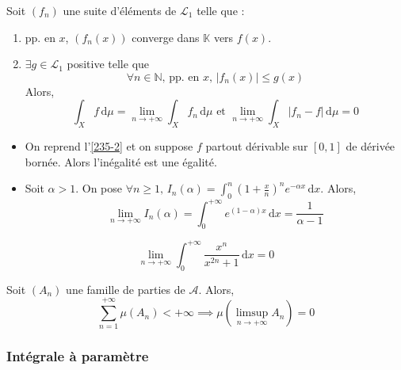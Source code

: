   \begin{theorem}
    Soit $(f_n)$ une suite d'éléments de $\mathcal{L}_1$ telle que :
    \begin{enumerate}[label={\bfseries(\roman*)}]
      \item pp. en $x$, $(f_n(x))$ converge dans $\mathbb{K}$ vers $f(x)$.
      \item $\exists g \in \mathcal{L}_1$ positive telle que
      \[ \forall n \in \mathbb{N}, \, \text{pp. en } x, \, \vert f_n(x) \vert \leq g(x) \]
      Alors,
      \[ \int_X f \, \mathrm{d}\mu = \lim_{n \rightarrow +\infty} \int_X f_n \, \mathrm{d}\mu \text{ et } \lim_{n \rightarrow +\infty} \int_X \vert f_n - f \vert \, \mathrm{d}\mu = 0 \]
    \end{enumerate}
  \end{theorem}

  \begin{example}
    \begin{itemize}
      \item On reprend l'\cref{235-2} et on suppose $f$ partout dérivable sur $[0,1]$ de dérivée bornée. Alors l'inégalité est une égalité.
      \item Soit $\alpha > 1$. On pose $\forall n \geq 1, \, I_n(\alpha) = \int_0^n \left( 1 + \frac{x}{n} \right)^n e^{-\alpha x} \, \mathrm{d}x$. Alors,
      \[ \lim_{n \rightarrow +\infty} I_n(\alpha) = \int_0^{+\infty} e^{(1-\alpha)x} \, \mathrm{d}x = \frac{1}{\alpha - 1} \]
    \end{itemize}
  \end{example}


  \begin{example}
    \[ \lim_{n \rightarrow +\infty} \int_{0}^{+\infty} \frac{x^n}{x^{2n} + 1} \, \mathrm{d}x = 0 \]
  \end{example}


  \begin{application}
    Soit $(A_n)$ une famille de parties de $\mathcal{A}$. Alors,
    \[ \sum_{n=1}^{+\infty} \mu(A_n) < +\infty \implies \mu \left( \limsup_{n \rightarrow +\infty} A_n \right) = 0 \]
  \end{application}

  \subsubsection{Intégrale à paramètre}

